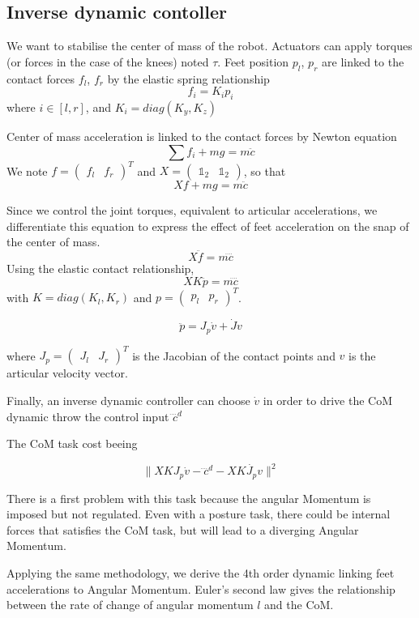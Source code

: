 \documentclass[12pt]{article}
\begin{document}
\subsection*{Inverse dynamic contoller}
We want to stabilise the center of mass of the robot. Actuators can apply torques (or forces in the case of the knees) noted $\tau$. Feet position $p_l$, $p_r$ are linked to the contact forces $f_l$, $f_r$ by the elastic spring relationship 
$$ f_i = K_i p_i$$
where $i \in [l,r]$, and $K_i = diag(K_y,K_z)$

Center of mass acceleration is linked to the contact forces by Newton equation
$$\sum f_i +mg= m\ddot{c}$$
We note 
$f = \begin{pmatrix} 
f_l &f_r 
\end{pmatrix}^T
$
and 
$X = \begin{pmatrix} 
\mathbb{1}_2 & \mathbb{1}_2
\end{pmatrix}$, 
so that 
$$X f +mg= m\ddot{c}$$

Since we control the joint torques, equivalent to articular accelerations, we differentiate this equation to express the effect of feet acceleration on the snap of the center of mass.
$$X \ddot{f}= m\ddddot{c}$$
Using the elastic contact relationship,
$$X K\ddot{p}= m\ddddot{c}$$
with $K = diag(K_l,K_r)$ and $p = \begin{pmatrix} p_l & p_r \end{pmatrix}^T$.

$$\ddot{p}=J_p\dot v + \dot J v$$

where $J_p = \begin{pmatrix} J_l & J_r \end{pmatrix}^T$ is the Jacobian of the contact points and $v$ is the articular velocity vector.

Finally, an inverse dynamic controller can choose $\dot v$ in order to drive the CoM dynamic throw the control input $\ddddot{c}^d$

The CoM task cost beeing 

$$\| X K J_p \dot{v} - \ddddot{c}^d-X K \dot{J_p} v\|^2$$

There is a first problem with this task because the angular Momentum is imposed but not regulated. Even with a posture task, there could be internal forces that satisfies the CoM task, but will lead to a diverging Angular Momentum.

Applying the same methodology, we derive the 4th order dynamic linking feet accelerations to Angular Momentum.
Euler's second law gives the relationship between the rate of change of angular momentum $l$ and the CoM.
\end{document}

